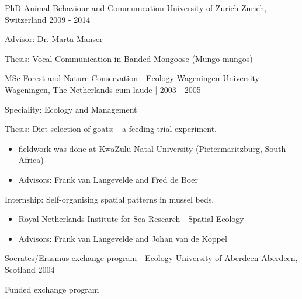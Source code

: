 

\begin{cventries}

  \cventry
    {PhD Animal Behaviour and Communication} %
    {University of Zurich} %
    {Zurich, Switzerland} %
    {2009 - 2014} %
    {
      \begin{cvitems} %
        \item {Advisor: Dr. Marta Manser}
        \item {Thesis: Vocal Communication in Banded Mongoose (Mungo mungos)}
      \end{cvitems}
    }

  \cventry
    {MSc Forest and Nature Conservation - Ecology} %
    {Wageningen University} %
    {Wageningen, The Netherlands} %
    {cum laude | 2003 - 2005} %
    {
      \begin{cvitems} %
      \item Speciality: Ecology and Management 
      \item {Thesis: Diet selection of goats: - a feeding trial  experiment.}
      \begin{itemize}
         \item fieldwork was done at KwaZulu-Natal University (Pietermaritzburg, South Africa)
         \item Advisors: Frank van Langevelde and Fred de Boer
      \end{itemize}
      \item {Internship: Self-organising spatial patterns in mussel beds.}
          \begin{itemize}
            \item Royal Netherlands Institute for Sea Research - Spatial Ecology
            \item Advisors: Frank van Langevelde and Johan van de Koppel
      \end{itemize}
       \end{cvitems}
    }

  \cventry
    {Socrates/Erasmus exchange program - Ecology} %
    {University of Aberdeen} %
    {Aberdeen, Scotland} %
    {2004} %
        {
      \begin{cvitems} %
        \item {Funded exchange program}
      \end{cvitems}
    }


\end{cventries}
